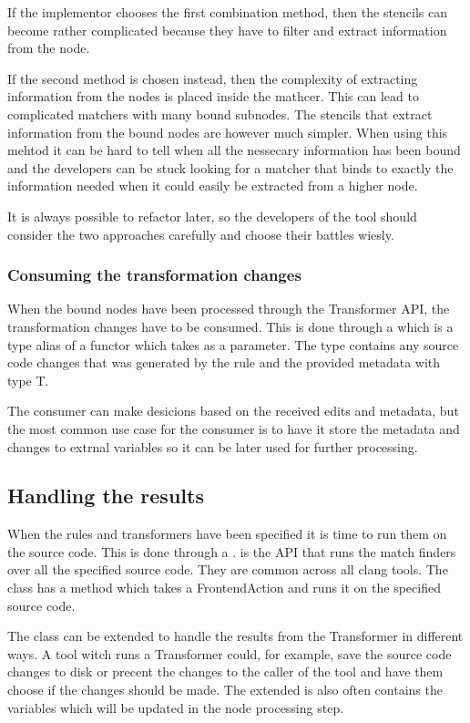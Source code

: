 If the implementor chooses the first combination method, then the stencils can become rather complicated because they have to filter and extract information from the node. 

If the second method is chosen instead, then the complexity of extracting information from the nodes is placed inside the mathcer. This can lead to complicated matchers with many bound subnodes. The stencils that extract information from the bound nodes are however much simpler. When using this mehtod it can be hard to tell when all the nessecary information has been bound and the developers can be stuck looking for a matcher that binds to exactly the information needed when it could easily be extracted from a higher node.

It is always possible to refactor later, so the developers of the tool should consider the two approaches carefully and choose their battles wiesly.

\subsubsection*{Consuming the transformation changes} \label{subsubsec:080dev:Consumers}

When the bound nodes have been processed through the Transformer API, the transformation changes have to be consumed. This is done through a  which is a type alias of a functor which takes  as a parameter. The  type contains any source code changes that was generated by the rule and the provided metadata with type T.

The consumer can make desicions based on the received edits and metadata, but the most common use case for the consumer is to have it store the metadata and changes to extrnal variables so it can be later used for further processing.

\subsection{Handling the results} \label{subsec:080dev:HandlingToolResults}

When the rules and transformers have been specified it is time to run them on the source code. This is done through a .  is the API that runs the match finders over all the specified source code. They are common across all clang tools. The  class has a  method which takes a FrontendAction and runs it on the specified source code. 

The  class can be extended to handle the results from the Transformer in different ways. A tool witch runs a Transformer could, for example, save the source code changes to disk or precent the changes to the caller of the tool and have them choose if the changes should be made. The extended  is also often contains the variables which will be updated in the node processing step.